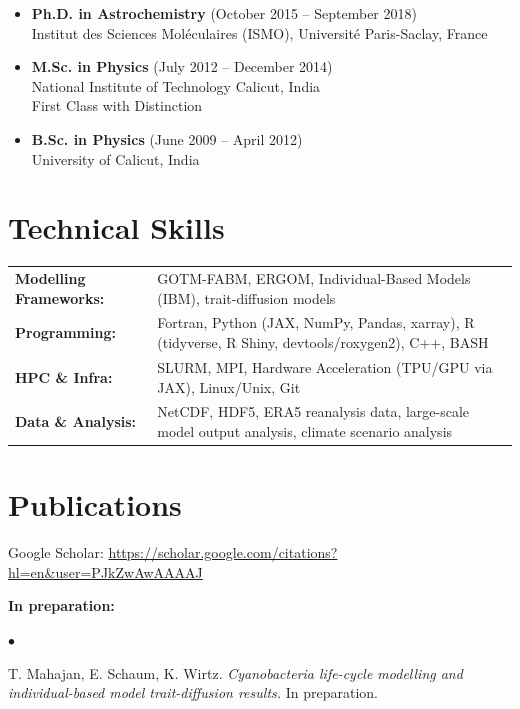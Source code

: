 \documentclass[margin,line,pifont,palatino,courier]{res}
\newenvironment{list2}{
  \begin{list}{$\bullet$}{%
      \setlength{\itemsep}{0in}
      \setlength{\parsep}{0in} \setlength{\parskip}{0in}
      \setlength{\topsep}{0in} \setlength{\partopsep}{0in}
      \setlength{\leftmargin}{0.1in}}}{\end{list}}
\begin{document}
\begin{resume}
\begin{itemize}
\item {\bf Ph.D. in Astrochemistry} (October 2015 -- September 2018)\\
Institut des Sciences Mol\'eculaires (ISMO), Universit\'e Paris-Saclay, France
\vspace*{.03in}
\item {\bf M.Sc. in Physics} (July 2012 -- December 2014)\\
National Institute of Technology Calicut, India\\
First Class with Distinction
\vspace*{.03in}
\item {\bf B.Sc. in Physics} (June 2009 -- April 2012)\\
University of Calicut, India
\end{itemize}

\section{\sc Technical Skills}

\begin{tabular}{@{}p{1.5in}p{4in}}
{\bf Modelling Frameworks:} & GOTM-FABM, ERGOM, Individual-Based Models (IBM), trait-diffusion models\\[1ex]
{\bf Programming:} & Fortran, Python (JAX, NumPy, Pandas, xarray), R (tidyverse, R Shiny, devtools/roxygen2), C++, BASH\\[1ex]
{\bf HPC \& Infra:} & SLURM, MPI, Hardware Acceleration (TPU/GPU via JAX), Linux/Unix, Git\\[1ex]
{\bf Data \& Analysis:} & NetCDF, HDF5, ERA5 reanalysis data, large-scale model output analysis, climate scenario analysis
\end{tabular}

\section{\sc Publications}

Google Scholar: \url{https://scholar.google.com/citations?hl=en&user=PJkZwAwAAAAJ}

\textbf{In preparation:}
\begin{list2}
\item T. Mahajan, E. Schaum, K. Wirtz. \textit{Cyanobacteria life-cycle modelling and individual-based model trait-diffusion results.} In preparation.
\end{list2}


\end{resume}
\end{document}
